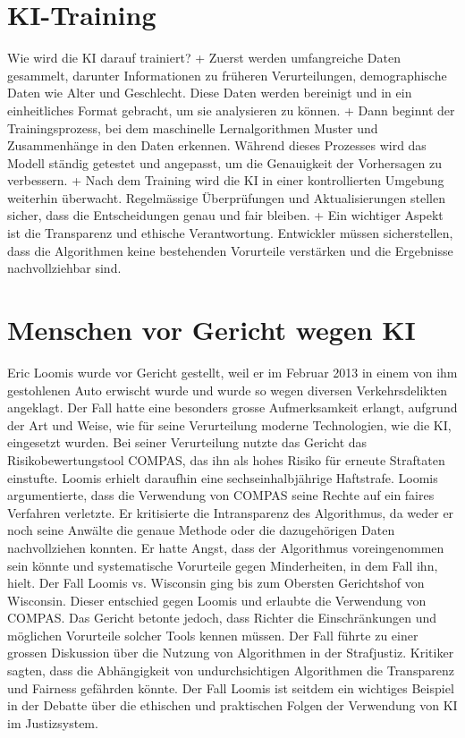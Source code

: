 \documentclass{article}
\begin{document}
\section {KI-Training}

Wie wird die KI darauf trainiert? \newline + Zuerst werden umfangreiche Daten gesammelt, darunter Informationen zu früheren Verurteilungen, 
demographische Daten wie Alter und Geschlecht. Diese Daten werden bereinigt und in ein einheitliches 
Format gebracht, um sie analysieren zu können. \newline + Dann beginnt der Trainingsprozess, bei dem maschinelle Lernalgorithmen Muster und Zusammenhänge in den 
Daten erkennen. Während dieses Prozesses wird das Modell ständig getestet und angepasst, um die 
Genauigkeit der Vorhersagen zu verbessern. \newline + Nach dem Training wird die KI in einer kontrollierten Umgebung weiterhin überwacht. Regelmässige 
Überprüfungen und Aktualisierungen stellen sicher, dass die Entscheidungen genau und fair bleiben. \newline + Ein wichtiger Aspekt ist die Transparenz und ethische Verantwortung. Entwickler müssen sicherstellen, 
dass die Algorithmen keine bestehenden Vorurteile verstärken und die Ergebnisse nachvollziehbar sind. 



\section {Menschen vor Gericht wegen KI}

Eric Loomis wurde vor Gericht gestellt, weil er im Februar 2013 in einem von ihm gestohlenen Auto 
erwischt wurde und wurde so wegen diversen Verkehrsdelikten angeklagt. Der Fall hatte eine besonders grosse 
Aufmerksamkeit erlangt, aufgrund der Art und Weise, wie für seine Verurteilung moderne
Technologien, wie die KI, eingesetzt wurden.  
Bei seiner Verurteilung nutzte das Gericht das Risikobewertungstool COMPAS, das ihn als hohes Risiko für erneute 
Straftaten einstufte. Loomis erhielt daraufhin eine sechseinhalbjährige Haftstrafe.
Loomis argumentierte, dass die Verwendung von COMPAS seine Rechte auf ein faires Verfahren verletzte. Er kritisierte 
die Intransparenz des Algorithmus, da weder er noch seine Anwälte die genaue Methode oder die dazugehörigen Daten 
nachvollziehen konnten. Er hatte Angst, dass der Algorithmus voreingenommen sein könnte und systematische Vorurteile 
gegen Minderheiten, in dem Fall ihn, hielt.
Der Fall Loomis vs. Wisconsin ging bis zum Obersten Gerichtshof von Wisconsin. Dieser entschied gegen Loomis und 
erlaubte die Verwendung von COMPAS. Das Gericht betonte jedoch, dass Richter die Einschränkungen und möglichen Vorurteile 
solcher Tools kennen müssen.
Der Fall führte zu einer grossen Diskussion über die Nutzung von Algorithmen in der Strafjustiz. Kritiker sagten, 
dass die Abhängigkeit von undurchsichtigen Algorithmen die Transparenz und Fairness gefährden könnte. Der Fall Loomis 
ist seitdem ein wichtiges Beispiel in der Debatte über die ethischen und praktischen Folgen der Verwendung 
von KI im Justizsystem. 
\end{document}
